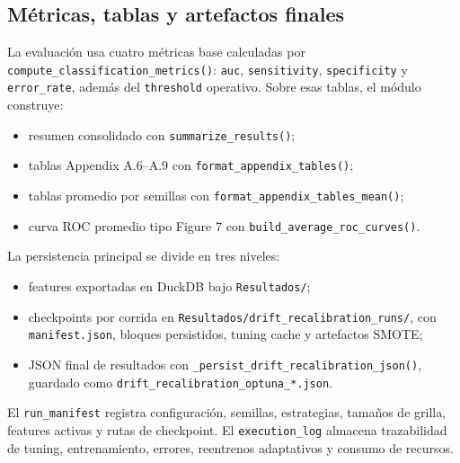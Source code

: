 \subsection{M\'etricas, tablas y artefactos finales}
La evaluaci\'on usa cuatro m\'etricas base calculadas por \texttt{compute\_classification\_metrics()}: \texttt{auc}, \texttt{sensitivity}, \texttt{specificity} y \texttt{error\_rate}, adem\'as del \texttt{threshold} operativo. Sobre esas tablas, el m\'odulo construye:
\begin{itemize}[leftmargin=*]
  \item resumen consolidado con \texttt{summarize\_results()};
  \item tablas Appendix A.6--A.9 con \texttt{format\_appendix\_tables()};
  \item tablas promedio por semillas con \texttt{format\_appendix\_tables\_mean()};
  \item curva ROC promedio tipo Figure 7 con \texttt{build\_average\_roc\_curves()}.
\end{itemize}

La persistencia principal se divide en tres niveles:
\begin{itemize}[leftmargin=*]
  \item features exportadas en DuckDB bajo \texttt{Resultados/};
  \item checkpoints por corrida en \texttt{Resultados/drift\_recalibration\_runs/}, con \texttt{manifest.json}, bloques persistidos, tuning cache y artefactos SMOTE;
  \item JSON final de resultados con \texttt{\_persist\_drift\_recalibration\_json()}, guardado como \texttt{drift\_recalibration\_optuna\_*.json}.
\end{itemize}

El \texttt{run\_manifest} registra configuraci\'on, semillas, estrategias, tama\~nos de grilla, features activas y rutas de checkpoint. El \texttt{execution\_log} almacena trazabilidad de tuning, entrenamiento, errores, reentrenos adaptativos y consumo de recursos.

